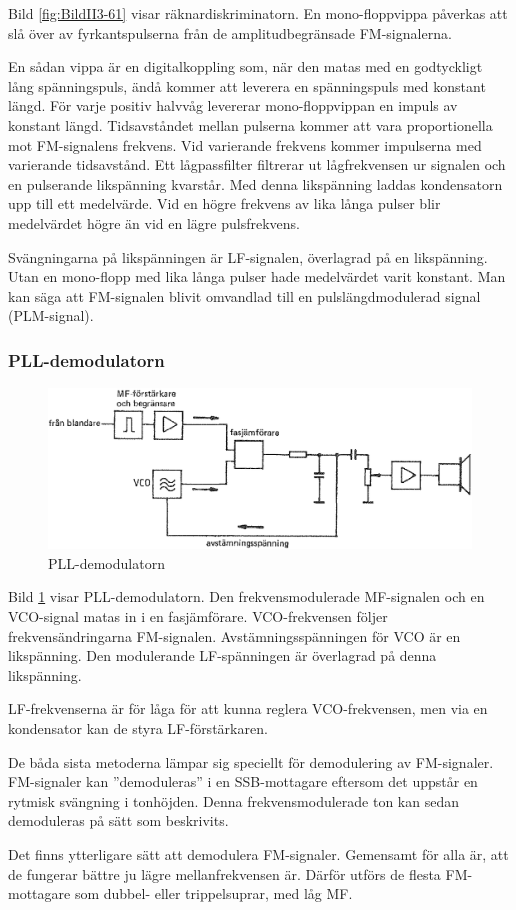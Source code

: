 Bild \ref{fig:BildII3-61} visar räknardiskriminatorn.
En mono-floppvippa påverkas att slå över av fyrkantspulserna från de
amplitudbegränsade FM-signalerna.

En sådan vippa är en digitalkoppling som, när den matas med en godtyckligt lång
spänningspuls, ändå kommer att leverera en spänningspuls med konstant längd.
För varje positiv halvvåg levererar mono-floppvippan en impuls av konstant
längd.
Tidsavståndet mellan pulserna kommer att vara proportionella mot FM-signalens
frekvens.
Vid varierande frekvens kommer impulserna med varierande tidsavstånd.
Ett lågpassfilter filtrerar ut lågfrekvensen ur signalen och en pulserande
likspänning kvarstår.
Med denna likspänning laddas kondensatorn upp till ett medelvärde.
Vid en högre frekvens av lika långa pulser blir medelvärdet högre än vid en
lägre pulsfrekvens.

Svängningarna på likspänningen är LF-signalen, överlagrad på en likspänning.
Utan en mono-flopp med lika långa pulser hade medelvärdet varit konstant.
Man kan säga att FM-signalen blivit omvandlad till en pulslängdmodulerad signal
(PLM-signal).

\subsubsection{PLL-demodulatorn}

\begin{figure}
\includegraphics[width=\textwidth]{images/cropped_pdfs/bild_2_3-62.pdf}
\caption{PLL-demodulatorn}
\label{fig:BildII3-62}
\end{figure}

Bild \ref{fig:BildII3-62} visar PLL-demodulatorn.
Den frekvensmodulerade MF-signalen och en VCO-signal matas in i en
fasjämförare.
VCO-frekvensen följer frekvensändringarna FM-signalen.
Avstämningsspänningen för VCO är en likspänning.
Den modulerande LF-spänningen är överlagrad på denna likspänning.

LF-frekvenserna är för låga för att kunna reglera VCO-frekvensen, men
via en kondensator kan de styra LF-förstärkaren.

De båda sista metoderna lämpar sig speciellt för demodulering av FM-signaler.
FM-signaler kan ''demoduleras'' i en SSB-mottagare eftersom det uppstår en
rytmisk svängning i tonhöjden.
Denna frekvensmodulerade ton kan sedan demoduleras på sätt som beskrivits.

Det finns ytterligare sätt att demodulera FM-signaler.
Gemensamt för alla är, att de fungerar bättre ju lägre mellanfrekvensen är.
Därför utförs de flesta FM-mottagare som dubbel- eller trippelsuprar, med låg
MF.
